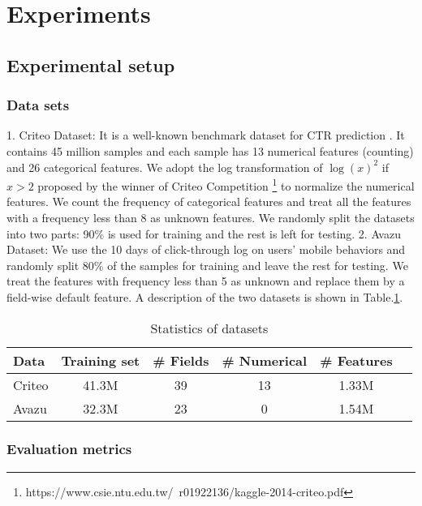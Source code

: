 \documentclass[sigconf]{acmart}
\begin{document}
\section{Experiments}

\subsection{Experimental setup}
\subsubsection{Data sets}

1. Criteo Dataset: It is a well-known benchmark dataset for CTR prediction \cite{criteo}. It contains 45 million samples and each sample has 13 numerical features (counting) and 26 categorical features. We adopt the log transformation of $\log(x)^2$ if $x>2$ proposed by the winner of Criteo Competition \footnote{https://www.csie.ntu.edu.tw/~r01922136/kaggle-2014-criteo.pdf} to normalize the numerical features. We count the frequency of categorical features and treat all the features with a frequency less than 8 as unknown features. We randomly split the datasets into two parts: 90\% is used for training and the rest is left for testing. 2. Avazu Dataset: We use the 10 days of click-through log on users' mobile behaviors and randomly split 80\% of the samples for training and leave the rest for testing. We treat the features with frequency less than 5 as unknown and replace them by a field-wise default feature. A description of the two datasets is shown in Table.\ref{tab:table}. 

\begin{table}
 \caption{Statistics of datasets}
  \centering
  \begin{tabular}{lccccr}
    \toprule
Data     & Training set  & \#  Fields  & \# Numerical   & \# Features & \\
    \midrule
    Criteo        &  41.3M & 39 & 13 & 1.33M    \\
    
    Avazu       & 32.3M & 23 & 0 & 1.54M \\
    \bottomrule
  \end{tabular}
  \label{tab:table}
\end{table}

\subsubsection{Evaluation metrics}
\end{document}
